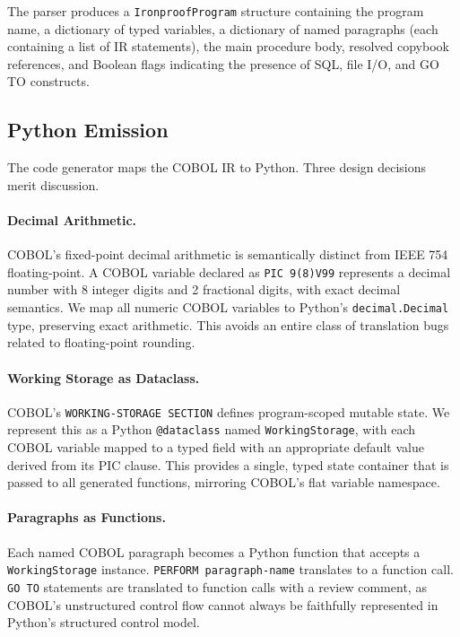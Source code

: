 \documentclass[sigconf,nonacm]{acmart}
\begin{document}
The parser produces a \texttt{IronproofProgram} structure containing the program name, a dictionary of typed variables, a dictionary of named paragraphs (each containing a list of IR statements), the main procedure body, resolved copybook references, and Boolean flags indicating the presence of SQL, file I/O, and GO TO constructs.

\subsection{Python Emission}\label{sec:codegen}

The code generator maps the COBOL IR to Python. Three design decisions merit discussion.

\paragraph{Decimal Arithmetic.} COBOL's fixed-point decimal arithmetic is semantically distinct from IEEE 754 floating-point. A COBOL variable declared as \texttt{PIC 9(8)V99} represents a decimal number with 8 integer digits and 2 fractional digits, with exact decimal semantics. We map all numeric COBOL variables to Python's \texttt{decimal.Decimal} type, preserving exact arithmetic. This avoids an entire class of translation bugs related to floating-point rounding.

\paragraph{Working Storage as Dataclass.} COBOL's \texttt{WORKING-STORAGE SECTION} defines program-scoped mutable state. We represent this as a Python \texttt{@dataclass} named \texttt{WorkingStorage}, with each COBOL variable mapped to a typed field with an appropriate default value derived from its PIC clause. This provides a single, typed state container that is passed to all generated functions, mirroring COBOL's flat variable namespace.

\paragraph{Paragraphs as Functions.} Each named COBOL paragraph becomes a Python function that accepts a \texttt{WorkingStorage} instance. \texttt{PERFORM paragraph-name} translates to a function call. \texttt{GO TO} statements are translated to function calls with a review comment, as COBOL's unstructured control flow cannot always be faithfully represented in Python's structured control model.
\end{document}
